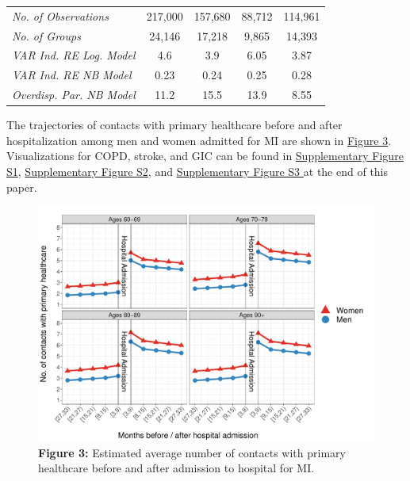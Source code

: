\begin{landscape}
\begin{table}[H]
\begin{tabular}{lcccccccc}
    \midrule
    \textit{No. of Observations} & \multicolumn{2}{c}{217,000} & \multicolumn{2}{c}{157,680} & \multicolumn{2}{c}{88,712} & \multicolumn{2}{c}{114,961} \\
    \textit{No. of Groups} & \multicolumn{2}{c}{24,146} & \multicolumn{2}{c}{17,218} & \multicolumn{2}{c}{9,865} & \multicolumn{2}{c}{14,393} \\
    \textit{VAR Ind. RE Log. Model} & \multicolumn{2}{c}{4.6} & \multicolumn{2}{c}{3.9} & \multicolumn{2}{c}{6.05} & \multicolumn{2}{c}{3.87} \\
    \textit{VAR Ind. RE NB Model} & \multicolumn{2}{c}{0.23} & \multicolumn{2}{c}{0.24} & \multicolumn{2}{c}{0.25} & \multicolumn{2}{c}{0.28} \\
    \textit{Overdisp. Par. NB Model} & \multicolumn{2}{c}{11.2} & \multicolumn{2}{c}{15.5} & \multicolumn{2}{c}{13.9} & \multicolumn{2}{c}{8.55} \\
    \bottomrule
    \end{tabular}%
\label{ch3:tab3}
\end{table}%

\end{landscape}




The trajectories of contacts with primary healthcare before and after 
hospitalization among men and women admitted for MI are shown in 
\hyperref[ch3:fig3]{Figure 3}. Visualizations for COPD, stroke, 
and GIC can be found in \hyperref[ch3:figS1]{Supplementary Figure S1},
\hyperref[ch3:figS2]{Supplementary Figure S2}, and
\hyperref[ch3:figS3]{Supplementary Figure S3 } at the end of this paper.\\

	\begin{figure}[H]
		\centering
		\includegraphics[scale=0.425]{Paper_2/MAIN_Figure_3.pdf}
		\caption*{\textbf{Figure 3:} 	Estimated average number of contacts with 
										primary healthcare before and after admission 
										to hospital for MI.}
	\label{ch3:fig3}
	\end{figure}


